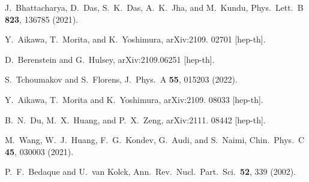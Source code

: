 \documentclass[aps,prc,reprint,superscriptaddress,nofootinbib]{revtex4-2}
\begin{document}
\begin{thebibliography}{999}
J.~Bhattacharya, D.~Das, S.~K.~Das, A.~K.~Jha, and M.~Kundu,
Phys.\ Lett.\ B \textbf{823}, 136785 (2021).

Y.~Aikawa, T.~Morita, and K.~Yoshimura,
arXiv:2109. 02701 [hep-th].

D.~Berenstein and G.~Hulsey,
arXiv:2109.06251 [hep-th].

S.~Tchoumakov and S.~Florens,
J.\ Phys.\ A \textbf{55}, 015203 (2022).

Y.~Aikawa, T.~Morita and K.~Yoshimura,
arXiv:2109. 08033 [hep-th].

B.~N.~Du, M.~X.~Huang, and P.~X.~Zeng,
arXiv:2111. 08442 [hep-th].


M.~Wang, W.~J.~Huang, F.~G.~Kondev, G.~Audi, and S.~Naimi,
Chin.\ Phys.\ C \textbf{45}, 030003 (2021).

P.~F.~Bedaque and U.~van Kolck,
Ann.\ Rev.\ Nucl.\ Part.\ Sci.\ \textbf{52}, 339 (2002).


\end{thebibliography}
\end{document}
